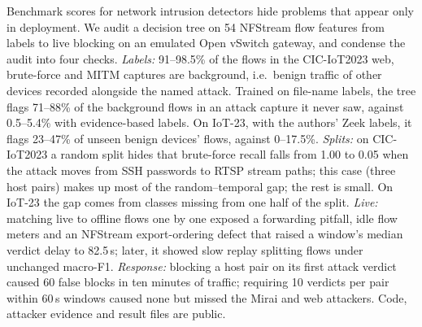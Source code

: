 Benchmark scores for network intrusion detectors hide problems that appear only in deployment. We audit a decision tree on 54 NFStream flow features from labels to live blocking on an emulated Open vSwitch gateway, and condense the audit into four checks. \emph{Labels:} 91--98.5\% of the flows in the CIC-IoT2023 web, brute-force and MITM captures are background, i.e.\ benign traffic of other devices recorded alongside the named attack. Trained on file-name labels, the tree flags 71--88\% of the background flows in an attack capture it never saw, against 0.5--5.4\% with evidence-based labels. On IoT-23, with the authors' Zeek labels, it flags 23--47\% of unseen benign devices' flows, against 0--17.5\%. \emph{Splits:} on CIC-IoT2023 a random split hides that brute-force recall falls from 1.00 to 0.05 when the attack moves from SSH passwords to RTSP stream paths; this case (three host pairs) makes up most of the random--temporal gap; the rest is small. On IoT-23 the gap comes from classes missing from one half of the split. \emph{Live:} matching live to offline flows one by one exposed a forwarding pitfall, idle flow meters and an NFStream export-ordering defect that raised a window's median verdict delay to 82.5\,s; later, it showed slow replay splitting flows under unchanged macro-F1. \emph{Response:} blocking a host pair on its first attack verdict caused 60 false blocks in ten minutes of traffic; requiring 10 verdicts per pair within 60\,s windows caused none but missed the Mirai and web attackers. Code, attacker evidence and result files are public.
